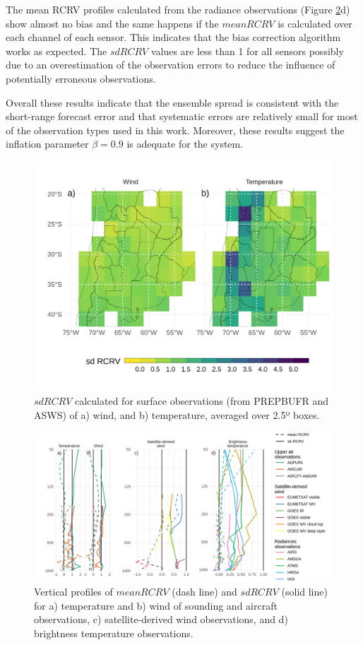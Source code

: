 \documentclass[final,5p,times,twocolumn,authoryear]{elsarticle} %
\begin{document}
The mean RCRV profiles calculated from the radiance observations (Figure \ref{fig:rcrv-profile}d) show almost no bias and the same happens if the \(mean RCRV\) is calculated over each channel of each sensor. This indicates that the bias correction algorithm works as expected. The \(sd RCRV\) values are less than 1 for all sensors possibly due to an overestimation of the observation errors to reduce the influence of potentially erroneous observations.

Overall these results indicate that the ensemble spread is consistent with the short-range forecast error and that systematic errors are relatively small for most of the observation types used in this work. Moreover, these results suggest the inflation parameter \(\beta = 0.9\) is adequate for the system.



\begin{figure}
\includegraphics[width=1\linewidth]{../figures/rcrv-sfc-1} \caption{\(sd RCRV\) calculated for surface observations (from PREPBUFR and ASWS) of a) wind, and b) temperature, averaged over 2.5º boxes.}\label{fig:rcrv-sfc}
\end{figure}



\begin{figure}
\includegraphics{../figures/rcrv-profile-1} \caption{Vertical profiles of \(mean RCRV\) (dash line) and \(sd RCRV\) (solid line) for a) temperature and b) wind of sounding and aircraft observations, c) satellite-derived wind observations, and d) brightness temperature observations.}\label{fig:rcrv-profile}
\end{figure}
\end{document}
